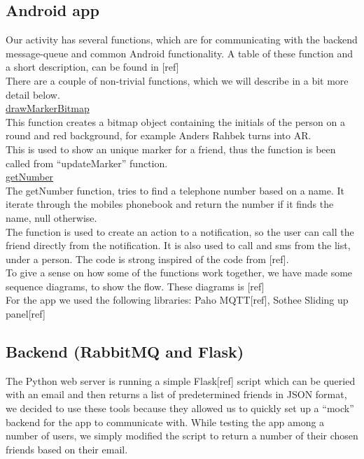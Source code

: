 \documentclass[runningheads,a4paper]{llncs}
\begin{document}
\subsection{Android app}
Our activity has several functions, which are for communicating with the backend message-queue and common Android functionality. A table of these function and a short description, can be found in [ref] \\


There are a couple of non-trivial functions, which we will describe in a bit more detail below.\\

\underline{drawMarkerBitmap}\\
This function creates a bitmap object containing the initials of the person on a round and red background, for example Anders Rahbek turns into AR.\\

This is used to show an unique marker for a friend, thus the function is been called from “updateMarker” function. \\

\underline{getNumber}\\
The getNumber function, tries to find a telephone number based on a name. It iterate through the mobiles phonebook and return the number if it finds the name, null otherwise. \\

The function is used to create an action to a notification, so the user can call the friend directly from the notification. It is also used to call and sms from the list, under a person. 
The code is strong inspired of the code from [ref].\\


To give a sense on how some of the functions work together, we have made some sequence diagrams, to show the flow. These diagrams is [ref]\\ 

For the app we used the following libraries: Paho MQTT[ref], Sothee Sliding up panel[ref]


\subsection{Backend (RabbitMQ and Flask)}
The Python web server is running a simple Flask[ref] script which can be queried with an email and then returns a list of predetermined friends in JSON format, we decided to use these tools because they allowed us to quickly set up a “mock” backend for the app to communicate with. While testing the app among a number of users, we simply modified the script to return a number of their chosen friends based on their email.\\
\end{document}
